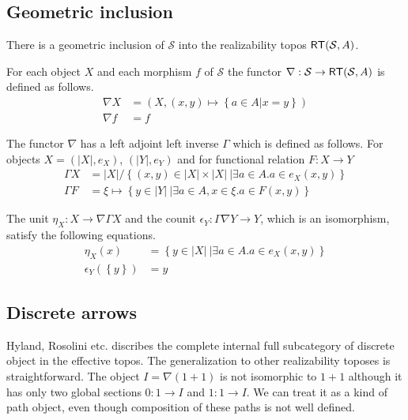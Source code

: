 \documentclass{amsart}
\theoremstyle{plain}
\theoremstyle{definition}
\newcommand\cat\mathcal
\newcommand\set[1]{\left\{#1\right\}}
\begin{document}
\subsection{Geometric inclusion}
There is a geometric inclusion of $\cat S$ into the realizability topos $\rt(\cat S,A)$.

For each object $X$ and each morphism $f$ of $\cat S$ the functor $\nabla:\cat S \to\rt(\cat S,A)$ is defined as follows.
\begin{align*}
\nabla X &= (X, (x,y)\mapsto \set{a\in A|x=y})\\
\nabla f &= f
\end{align*}

The functor $\nabla$ has a left adjoint left inverse $\Gamma$ which is defined as follows. For objects $X=(|X|,e_X)$, $(|Y|,e_Y)$ and for functional relation $F:X\to Y$
\begin{align*}
\Gamma X &= |X|/\set{(x,y)\in |X|\times |X|\ | \exists a\in A. a\in e_X(x,y)}\\
\Gamma F &= \xi \mapsto \set{y\in |Y|\ | \exists a\in A,x\in \xi. a\in F(x,y) }
\end{align*}

The unit $\eta_X:X\to \nabla\Gamma X$ and the counit $\epsilon_Y:\Gamma \nabla Y \to Y$, which is an isomorphism, satisfy the following equations.
\begin{align*}
\eta_X(x) &= \set{y\in |X|\ |\exists a\in A. a\in e_X(x,y)}\\
\epsilon_Y(\set y) &= y
\end{align*}




\subsection{Discrete arrows}
Hyland, Rosolini etc. discribes the complete internal full subcategory of discrete object in the effective topos. The generalization to other realizability toposes is straightforward. The object $I = \nabla(1+1)$ is not isomorphic to $1+1$ although it has only two global sections $0:1\to I$ and $1:1\to I$. We can treat it as a kind of path object, even though composition of these paths is not well defined.
\end{document}
